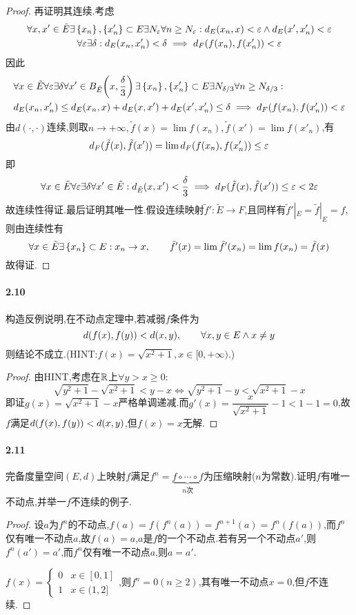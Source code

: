 \documentclass[UTF8]{article}
\begin{document}
\begin{proof}
    再证明其连续.考虑$$\begin{gathered}
        \forall x,x'\in \tilde{E}\exists \left\{x_n\right\},\left\{x'_n\right\}\subset E\exists N_\varepsilon\forall n\geq N_\varepsilon:d_E(x_n,x)<\varepsilon\land d_E(x',x'_n)<\varepsilon\\
        \forall \varepsilon \exists \delta:d_E(x_n,x'_n)<\delta\implies d_F(f(x_n),f(x'_n))<\varepsilon
    \end{gathered}$$
    因此
    $$\begin{aligned}
        &\forall x\in \tilde{E}\forall \varepsilon\exists \delta\forall x'\in B_{\tilde{E}}\!\left(x,\frac{\delta}{3}\right)\exists\left\{x_n\right\},\left\{x'_n\right\}\subset E\exists N_{\delta/3}\forall n\geq N_{\delta/3}:\\
        &d_E(x_n,x'_n)\leq d_E(x_n,x)+d_E(x,x')+d_E(x',x'_n)\leq \delta\implies d_F(f(x_n),f(x'_n))<\varepsilon
    \end{aligned}$$
    由$d(\cdot,\cdot)$连续,则取$n\to +\infty, \tilde{f}(x)=\lim f(x_n), \tilde{f}(x')=\lim f(x'_n)$,有$$d_F(\tilde{f}(x),\tilde{f}(x'))=\lim d_F(f(x_n),f(x'_n))\leq \varepsilon$$
    即$$\forall x\in \tilde{E}\forall\varepsilon \exists \delta\forall x'\in \tilde{E}:d_{\tilde{E}}(x,x')<\frac{\delta}{3}\implies d_F(\tilde{f}(x),\tilde{f}(x'))\leq \varepsilon<2\varepsilon$$
    故连续性得证.最后证明其唯一性.假设连续映射$\tilde{f}':\tilde{E}\to F$,且同样有$\tilde{f}'|_E=\tilde{f}|_E=f$,则由连续性有
    $$\forall x\in\tilde{E}\exists \left\{x_n\right\}\subset E:x_n\to x,\qquad \tilde{f}'(x)=\lim \tilde{f}'(x_n)=\lim f(x_n)=\tilde{f}(x)$$
    故得证.
\end{proof}

\paragraph*{2.10}构造反例说明,在不动点定理中,若减弱$f$条件为$$d\!\left(f(x),f(y)\right)<d(x,y),\qquad \forall x,y\in E\land x\neq y$$则结论不成立.(HINT:$f(x)=\sqrt{x^2+1},x\in [0,+\infty)$.)
\begin{proof}
    由HINT,考虑在$\mathbb{R}$上$\forall y>x\geq 0$:
        $$\sqrt{y^2+1}-\sqrt{x^2+1}<y-x\iff \sqrt{y^2+1}-y<\sqrt{x^2+1}-x$$
        即证$g(x)=\sqrt{x^2+1}-x$严格单调递减.而$g'(x)=\dfrac{x}{\sqrt{x^2+1}}-1<1-1=0$,故$f$满足$d\!\left(f(x),f(y)\right)<d(x,y)$,但$f(x)=x$无解.
\end{proof}

\paragraph*{2.11}完备度量空间$(E,d)$上映射$f$满足$f^n=\underbrace{f\circ \cdots\circ f}_{n\text{次}}$为压缩映射($n$为常数).证明$f$有唯一不动点,并举一$f$不连续的例子.
\begin{proof}
    设$a$为$f^n$的不动点,$f(a)=f(f^n(a))=f^{n+1}(a)=f^n(f(a))$,而$f^n$仅有唯一不动点$a$,故$f(a)=a$,$a$是$f$的一个不动点.若有另一个不动点$a'$,则$f^n(a')=a'$,而$f^n$仅有唯一不动点$a$,则$a=a'$.

    $f(x)=\begin{cases}
        0&x\in [0,1]\\1&x\in (1,2]
    \end{cases}$,则$f^n=0(n\geq 2)$,其有唯一不动点$x=0$,但$f$不连续.
\end{proof}
\end{document}

